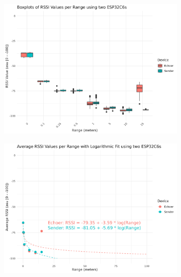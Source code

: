 \begin{figure}[H]
    \centering
    \begin{subfigure}{0.45\textwidth}
        \includegraphics[width=\linewidth]{rstudio/analysis/plots/ESP32C6_rssi_box.png}
    \end{subfigure}
    \begin{subfigure}{0.45\textwidth}
        \includegraphics[width=\linewidth]{rstudio/analysis/plots/ESP32C6_avg_rssi.png}
    \end{subfigure}


\end{figure}
